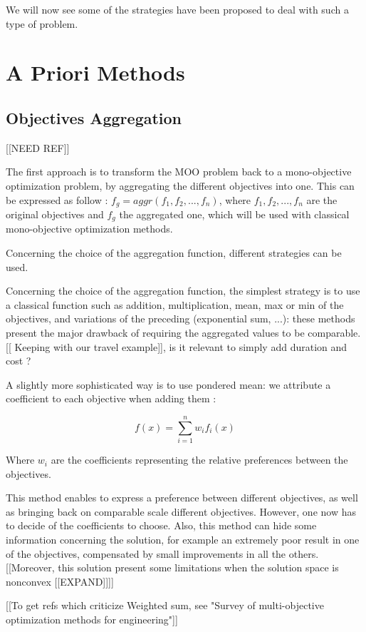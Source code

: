 We will now see some of the strategies have been proposed to deal with such a type of problem.

\section{A Priori Methods}

\subsection{Objectives Aggregation}

[[NEED REF]]

The first approach is to transform the MOO problem back to a mono-objective optimization problem, by aggregating the different objectives into one. This can be expressed as follow : \(f_g = aggr(f_1, f_2, ..., f_n)\), where \(f_1, f_2, ..., f_n\) are the original objectives and \(f_g\) the aggregated one, which will be used with classical mono-objective optimization methods.

Concerning the choice of the aggregation function, different strategies can be used.

Concerning the choice of the aggregation function, the simplest strategy is to use a classical function such as addition, multiplication, mean, max or min of the objectives, and variations of the preceding (exponential sum, ...): these methods present the major drawback of requiring the aggregated values to be comparable.[[ Keeping with our travel example]], is it relevant to simply add duration and cost ?

A slightly more sophisticated way is to use pondered mean: we attribute a coefficient to each objective when adding them :

\[ f(x) =\sum_{i=1}^n w_i f_i(x) \]

Where $w_i$ are the coefficients representing the relative preferences between the objectives.

This method enables to express a preference between different objectives, as well as bringing back on comparable scale different objectives. However, one now has to decide of the coefficients to choose. Also, this method can hide some information concerning the solution, for example an extremely poor result in one of the objectives, compensated by small improvements in all the others.  [[Moreover, this solution present some limitations when the solution space is nonconvex [[EXPAND]]]]

[[To get refs which criticize Weighted sum, see "Survey of multi-objective optimization methods for engineering"]]

